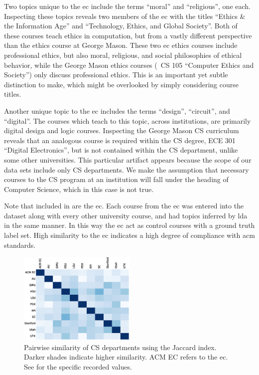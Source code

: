 
Two topics unique to the \ac{ec} include the terms ``moral'' and ``religious'', one each.
Inspecting these topics reveals two members of the \ac{ec} with the titles ``Ethics \& the Information Age'' and ``Technology, Ethics, and Global Society''.
Both of these courses teach ethics in computation, but from a vastly different perspective than the ethics course at George Mason.
These two \ac{ec} ethics courses include professional ethics, but also moral, religious, and social philosophies of ethical behavior, while the George Mason ethics courses (\eg\ CS 105 ``Computer Ethics and Society'') only discuss professional ethics.
This is an important yet subtle distinction to make, which might be overlooked by simply considering course titles.


Another unique topic to the \ac{ec} includes the terms ``design'', ``circuit'', and ``digital''.
The courses which teach to this topic, across institutions, are primarily digital design and logic courses.
Inspecting the George Mason CS curriculum reveals that an analogous course is required within the CS degree, ECE 301 ``Digital Electronics'', but is not contained within the CS department, unlike some other universities.
This particular artifact appears because the scope of our data sets include only CS departments.
We make the assumption that necessary courses to the CS program at an institution will fall under the heading of Computer Science, which in this case is not true.


Note that included in  are the \ac{ec}.
Each course from the \ac{ec} was entered into the dataset along with every other university course, and had topics inferred by \ac{lda} in the same manner.
In this way the \ac{ec} act as control courses with a ground truth label set.
High similarity to the \ac{ec} indicates a high degree of compliance with \ac{acm} standards.


\begin{figure}
  \includegraphics[width=0.5\textwidth]{figures/10by10heatmap}
  \caption{Pairwise similarity of CS departments using the Jaccard index. Darker shades indicate higher similarity. ACM EC refers to the \acf{ec}. See  for the specific recorded values.\label{fig:heatmap}}
\end{figure}

